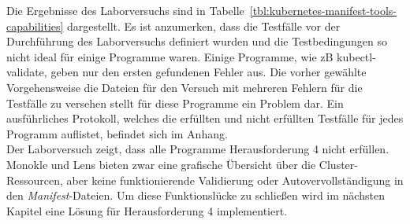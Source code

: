 Die Ergebnisse des Laborversuchs sind in Tabelle~\ref{tbl:kubernetes-manifest-tools-capabilities} dargestellt.
Es ist anzumerken, dass die Testfälle vor der Durchführung des Laborversuchs definiert wurden und die Testbedingungen so nicht
ideal für einige Programme waren. Einige Programme, wie \ac{zB} kubectl-validate, geben nur den ersten gefundenen Fehler aus.
Die vorher gewählte Vorgehensweise die Dateien für den Versuch mit mehreren Fehlern für die Testfälle zu versehen stellt für
diese Programme ein Problem dar. Ein ausführliches Protokoll, welches die erfüllten und nicht erfüllten Testfälle für jedes Programm
auflistet, befindet sich im Anhang. \\
Der Laborversuch zeigt, dass alle Programme Herausforderung 4 nicht erfüllen.
Monokle und Lens bieten zwar eine grafische Übersicht über die Cluster-Ressourcen, aber keine funktionierende
Validierung oder Autovervollständigung in den \textit{Manifest}-Dateien. Um diese Funktionslücke zu schließen wird im
nächsten Kapitel eine Lösung für Herausforderung 4 implementiert.

